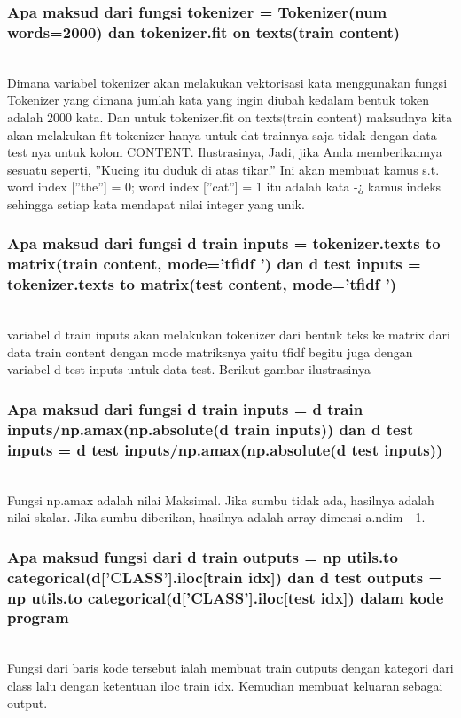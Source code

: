 	\subsubsection{Apa maksud dari fungsi tokenizer = Tokenizer(num words=2000) dan tokenizer.fit on texts(train content)} 
	\hfill\\
Dimana variabel tokenizer akan melakukan vektorisasi kata menggunakan fungsi
Tokenizer yang dimana jumlah kata yang ingin diubah kedalam bentuk token adalah
2000 kata. Dan untuk tokenizer.fit on texts(train content) maksudnya kita akan melakukan
fit tokenizer hanya untuk dat trainnya saja tidak dengan data test nya untuk kolom
CONTENT. Ilustrasinya, Jadi, jika Anda memberikannya sesuatu seperti, ”Kucing
itu duduk di atas tikar.” Ini akan membuat kamus s.t. word index [”the”] = 0;
word index [”cat”] = 1 itu adalah kata -¿ kamus indeks sehingga setiap kata mendapat nilai integer yang unik.
	
	\subsubsection{Apa maksud dari fungsi d train inputs = tokenizer.texts to matrix(train content, mode=’tfidf ’) dan d test inputs = tokenizer.texts to matrix(test content, mode=’tfidf ’)}
	\hfill\\
variabel d train inputs akan melakukan tokenizer dari bentuk
teks ke matrix dari data train content dengan mode matriksnya yaitu tfidf begitu juga
dengan variabel d test inputs untuk data test. Berikut gambar ilustrasinya

	\subsubsection{Apa maksud dari fungsi d train inputs = d train inputs/np.amax(np.absolute(d train inputs)) dan d test inputs = d test inputs/np.amax(np.absolute(d test inputs))}
	\hfill\\
Fungsi np.amax adalah nilai Maksimal. Jika sumbu tidak ada, hasilnya adalah nilai skalar. Jika sumbu diberikan, hasilnya adalah array dimensi a.ndim - 1.

	\subsubsection{Apa maksud fungsi dari d train outputs = np utils.to categorical(d[’CLASS’].iloc[train idx]) dan d test outputs = np utils.to categorical(d[’CLASS’].iloc[test idx]) dalam kode program}
	\hfill\\
Fungsi dari baris kode tersebut ialah membuat train outputs dengan kategori dari class lalu dengan ketentuan iloc train idx. Kemudian membuat keluaran sebagai output.
	

